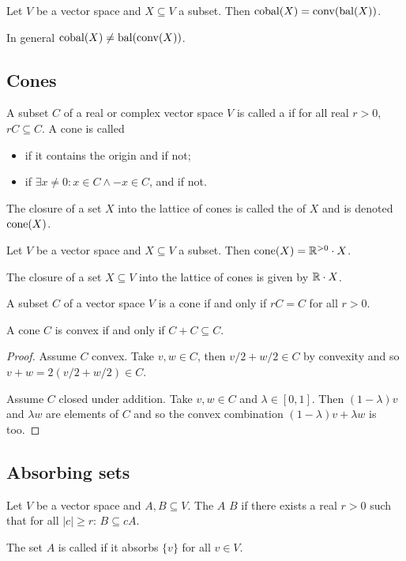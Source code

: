 \begin{lemma}
Let $V$ be a vector space and $X\subseteq V$ a subset. Then $\operatorname{cobal}(X) = \operatorname{conv}(\operatorname{bal}(X))$.
\end{lemma}
In general $\operatorname{cobal}(X) \neq \operatorname{bal}(\operatorname{conv}(X))$.



\subsection{Cones}
\begin{definition}
A subset $C$ of a real or complex vector space $V$ is called a  if for all real $r>0$, $rC \subseteq C$. A cone is called
\begin{itemize}
\item {} if it contains the origin and  if not;
\item {} if $\exists x\neq 0: x\in C \land -x\in C$, and  if not.
\end{itemize}
The closure of a set $X$ into the lattice of cones is called the  of $X$ and is denoted $\operatorname{cone}(X)$.
\end{definition}

\begin{lemma}
Let $V$ be a vector space and $X\subseteq V$ a subset. Then $\operatorname{cone}(X) = \mathbb{R}^{> 0}\cdot X$.
\end{lemma}

The closure of a set $X\subseteq V$ into the lattice of cones is given by $\mathbb{R}\cdot X$.

\begin{lemma} \label{coneEqualityLemma}
A subset $C$ of a vector space $V$ is a cone \textup{if and only if} $rC = C$ for all $r> 0$.
\end{lemma}

\begin{lemma} \label{convexityAdditiveClosure}
A cone $C$ is convex if and only if $C + C \subseteq C$. 
\end{lemma}
\begin{proof}
Assume $C$ convex. Take $v,w\in C$, then $v/2 + w/2\in C$ by convexity and so $v+w = 2(v/2+w/2)\in C$.

Assume $C$ closed under addition. Take $v,w\in C$ and $\lambda\in[0,1]$. Then $(1-\lambda)v$ and $\lambda w$ are elements of $C$ and so the convex combination $(1-\lambda)v + \lambda w$ is too.
\end{proof}


\subsection{Absorbing sets}
\begin{definition}
Let $V$ be a vector space and $A,B\subseteq V$. The $A$  $B$ if there exists a real $r>0$ such that for all $|c| \geq r$: $B\subseteq cA$.

The set $A$ is called  if it absorbs $\{v\}$ for all $v\in V$.
\end{definition}

